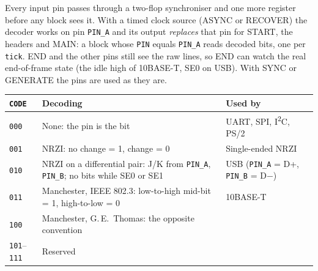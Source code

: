 \documentclass[11pt,a4paper]{article}
\newcommand{\sig}[1]{\texttt{#1}}
\begin{document}
Every input pin passes through a two-flop synchroniser and one more register before any block sees it. With a timed clock source (ASYNC or RECOVER) the decoder works on pin \sig{PIN\_A} and its output \emph{replaces} that pin for START, the headers and MAIN: a block whose \sig{PIN} equals \sig{PIN\_A} reads decoded bits, one per \sig{tick}. END and the other pins still see the raw lines, so END can watch the real end-of-frame state (the idle high of 10BASE-T, SE0 on USB). With SYNC or GENERATE the pins are used as they are.

\begin{center}
\begin{tabularx}{\linewidth}{@{}l >{\raggedright\arraybackslash}p{7.2cm} >{\raggedright\arraybackslash}X@{}}
\toprule
\sig{CODE} & Decoding & Used by \\
\midrule
\texttt{000} & None: the pin is the bit & UART, SPI, I\textsuperscript{2}C, PS/2 \\
\texttt{001} & NRZI: no change = 1, change = 0 & Single-ended NRZI \\
\texttt{010} & NRZI on a differential pair: J/K from \sig{PIN\_A}, \sig{PIN\_B}; no bits while SE0 or SE1 & USB (\sig{PIN\_A} = D+, \sig{PIN\_B} = D$-$) \\
\texttt{011} & Manchester, IEEE 802.3: low-to-high mid-bit = 1, high-to-low = 0 & 10BASE-T \\
\texttt{100} & Manchester, G.\,E.\ Thomas: the opposite convention & \\
\texttt{101}--\texttt{111} & Reserved & \\
\bottomrule
\end{tabularx}
\end{center}
\end{document}
